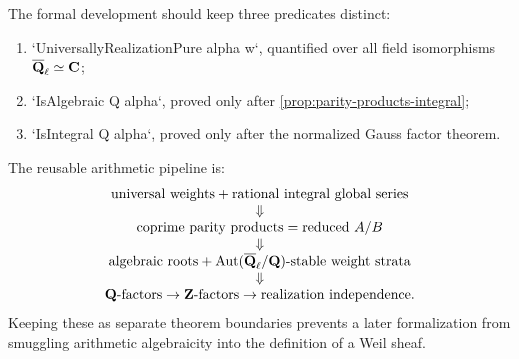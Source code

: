 \begin{formalization}
The formal development should keep three predicates distinct:
\begin{enumerate}
\item `UniversallyRealizationPure alpha w`, quantified over all field
      isomorphisms \(\overline{\mathbf Q}_\ell\simeq\mathbf C\);
\item `IsAlgebraic Q alpha`, proved only after
      \cref{prop:parity-products-integral};
\item `IsIntegral Q alpha`, proved only after the normalized Gauss
      factor theorem.
\end{enumerate}
The reusable arithmetic pipeline is:
\[
\begin{array}{c}
\text{universal weights}+\text{rational integral global series}\\
\Downarrow\\
\text{coprime parity products}=\text{reduced }A/B\\
\Downarrow\\
\text{algebraic roots}+\operatorname{Aut}(\overline{\mathbf Q}_\ell/\mathbf Q)
  \text{-stable weight strata}\\
\Downarrow\\
\mathbf Q\text{-factors}\to\mathbf Z\text{-factors}
\to\text{realization independence}.
\end{array}
\]
Keeping these as separate theorem boundaries prevents a later
formalization from smuggling arithmetic algebraicity into the definition
of a Weil sheaf.
\end{formalization}

